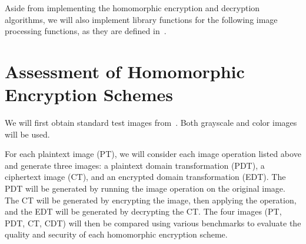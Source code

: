 Aside from implementing the homomorphic encryption and decryption algorithms, we will also implement library functions for the following image processing functions, as they are defined in~\cite{gonzalez_digital_2008}.



\section{Assessment of Homomorphic Encryption Schemes}

We will first obtain standard test images from~\cite{gonzalez_image_nodate}. Both grayscale and color images will be used.

For each plaintext image (PT), we will consider each image operation listed above and generate three images: a plaintext domain transformation (PDT), a ciphertext image (CT), and an encrypted domain transformation (EDT). The PDT will be generated by running the image operation on the original image. The CT will be generated by encrypting the image, then applying the operation, and the EDT will be generated by decrypting the CT. The four images (PT, PDT, CT, CDT) will then be compared using various benchmarks to evaluate the quality and security of each homomorphic encryption scheme.

